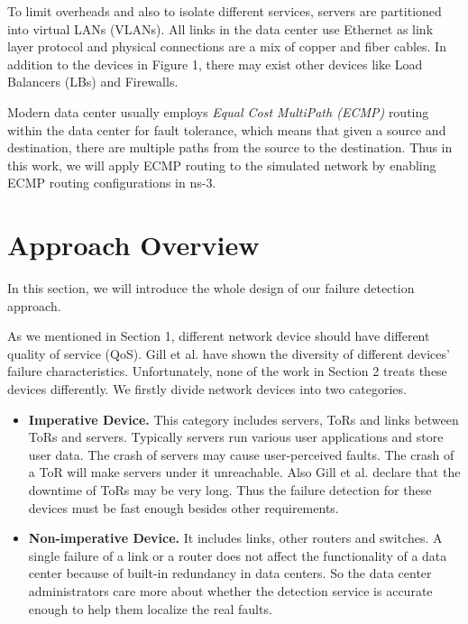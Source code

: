 \documentclass{sig-alternate-05-2015}
\begin{document}
To limit overheads and also to isolate different services, servers are partitioned into virtual LANs (VLANs). All links in the data center use Ethernet as link layer protocol and physical connections are a mix of copper and fiber cables. In addition to the devices in Figure 1, there may exist other devices like Load Balancers (LBs) and Firewalls.

Modern data center usually employs \textit{Equal Cost MultiPath (ECMP)} routing within the data center for fault tolerance, which means that given a source and destination, there are multiple paths from the source to the destination. Thus in this work, we will apply ECMP routing to the simulated network by enabling ECMP routing configurations in ns-3.


\section{Approach Overview}
In this section, we will introduce the whole design of our failure detection approach.

As we mentioned in Section 1, different network device should have different quality of service (QoS). Gill et al. \cite{gill2011understanding} have shown the diversity of different devices' failure characteristics. Unfortunately, none of the work in Section 2 treats these devices differently. We firstly divide network devices into two categories.

\begin{itemize}
\item \textbf{Imperative Device.} This category includes servers, ToRs and links between ToRs and servers. Typically servers run various user applications and store user data. The crash of servers may cause user-perceived faults. The crash of a ToR will make servers under it unreachable. Also Gill et al. declare that the downtime of ToRs may be very long. Thus the failure detection for these devices must be fast enough besides other requirements.

\item \textbf{Non-imperative Device.} It includes links, other routers and switches. A single failure of a link or a router does not affect the functionality of a data center because of built-in redundancy in data centers. So the data center administrators care more about whether the detection service is accurate enough to help them localize the real faults.

\end{itemize}
\end{document}

